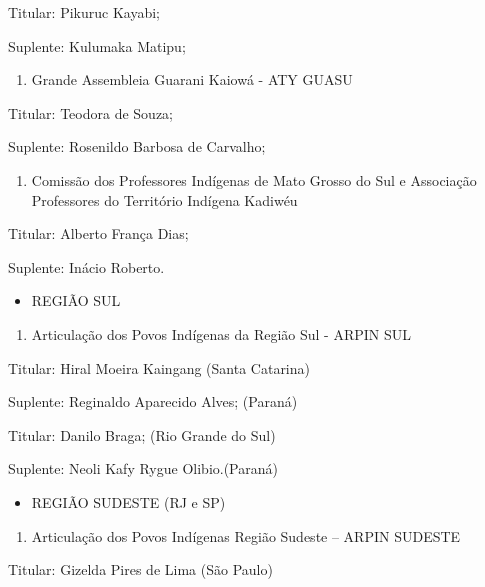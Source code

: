 \documentclass[
]{book}
\providecommand{\tightlist}{%
  \setlength{\itemsep}{0pt}\setlength{\parskip}{0pt}}
\begin{document}
Titular: Pikuruc Kayabi;

Suplente: Kulumaka Matipu;

\begin{enumerate}
\def\labelenumi{\alph{enumi})}
\setcounter{enumi}{2}
\tightlist
\item
  Grande Assembleia Guarani Kaiowá - ATY GUASU
\end{enumerate}

Titular: Teodora de Souza;

Suplente: Rosenildo Barbosa de Carvalho;

\begin{enumerate}
\def\labelenumi{\alph{enumi})}
\setcounter{enumi}{3}
\tightlist
\item
  Comissão dos Professores Indígenas de Mato Grosso do Sul e Associação Professores do Território Indígena Kadiwéu
\end{enumerate}

Titular: Alberto França Dias;

Suplente: Inácio Roberto.

\begin{itemize}
\tightlist
\item
  REGIÃO SUL
\end{itemize}

\begin{enumerate}
\def\labelenumi{\alph{enumi})}
\tightlist
\item
  Articulação dos Povos Indígenas da Região Sul - ARPIN SUL
\end{enumerate}

Titular: Hiral Moeira Kaingang (Santa Catarina)

Suplente: Reginaldo Aparecido Alves; (Paraná)

Titular: Danilo Braga; (Rio Grande do Sul)

Suplente: Neoli Kafy Rygue Olibio.(Paraná)

\begin{itemize}
\tightlist
\item
  REGIÃO SUDESTE (RJ e SP)
\end{itemize}

\begin{enumerate}
\def\labelenumi{\alph{enumi})}
\tightlist
\item
  Articulação dos Povos Indígenas Região Sudeste -- ARPIN SUDESTE
\end{enumerate}

Titular: Gizelda Pires de Lima (São Paulo)
\end{document}
